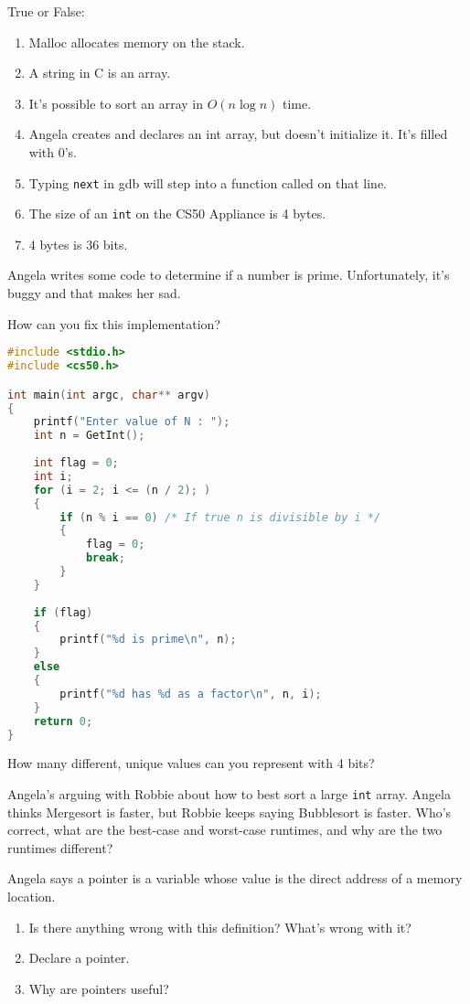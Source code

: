 \documentclass[12pt]{exam}
\begin{document}
\begin{questions}
\question
True or False:
\begin{enumerate}
\item Malloc allocates memory on the stack.
\item A string in C is an array.
\item It's possible to sort an array in $O(n \log{n})$ time.
\item Angela creates and declares an int array, but doesn't initialize it. It's filled with 0's.
\item Typing {\tt next} in gdb will step into a function called on that line.
\item The size of an {\tt int} on the CS50 Appliance is 4 bytes.
\item 4 bytes is 36 bits.
\end{enumerate}

\newpage

\question
Angela writes some code to determine if a number is prime. Unfortunately, it's buggy and that makes her sad.

How can you fix this implementation?

\begin{lstlisting}[language=c, mathescape]
#include <stdio.h>
#include <cs50.h>

int main(int argc, char** argv) 
{
    printf("Enter value of N : ");
    int n = GetInt();
  
    int flag = 0;
    int i;
    for (i = 2; i <= (n / 2); ) 
    { 
        if (n % i == 0) /* If true n is divisible by i */
        {
            flag = 0;
            break;
        }
    }
 
    if (flag)
    {
        printf("%d is prime\n", n);
    }
    else
    {    
        printf("%d has %d as a factor\n", n, i);
    }
    return 0;
}
\end{lstlisting}

\question
How many different, unique values can you represent with 4 bits?

\question 
Angela's arguing with Robbie about how to best sort a large {\tt int} array. Angela thinks Mergesort is faster, but Robbie keeps saying Bubblesort is faster. Who's correct, what are the best-case and worst-case runtimes, and why are the two runtimes different?

\makeemptybox{2in}

\newpage

\question
Angela says a pointer is a variable whose value is the direct address of a memory location. 
\begin{enumerate}
\item Is there anything wrong with this definition? What's wrong with it?
\item Declare a pointer.
\item Why are pointers useful?
\end{enumerate}
\makeemptybox{2in}



\end{questions}
\end{document}
